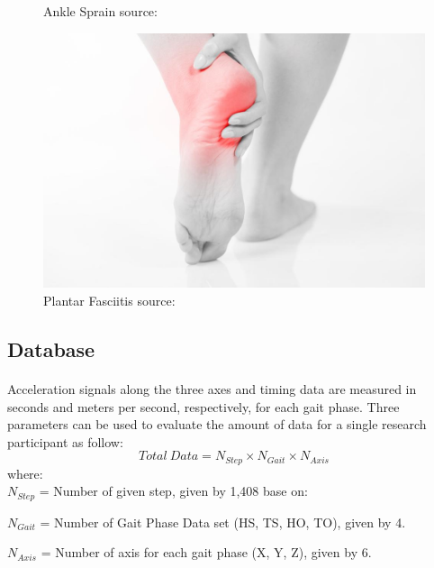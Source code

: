 {\begin{figure}[ht]
\begin{minipage}[b]{0.20\linewidth}
            \caption{Ankle Sprain  source:\cite{AnkleSprain2023}}
            \label{fig:b}
        \end{minipage}
        \hspace{0.5cm}
         \begin{minipage}[b]{0.20\linewidth}
            \centering
            \includegraphics[width=\textwidth]{img/Plantar Fasciitis.jpeg}
            \caption{Plantar Fasciitis  source:\cite{PlantarFasciitis2023}}
            \label{fig:b}
        \end{minipage}
    \end{figure}
}


\subsection{Database}
\STANDARD{\insertsection}
{
\framesubtitle{\insertsubsection}

Acceleration signals along the three axes and timing data are measured in seconds and meters per second, respectively, for each gait phase. Three parameters can be used to evaluate the amount of data for a single research participant as follow:
\begin{equation}
\label{eqn:2.1}
    Total\:Data = N_{Step} \times N_{Gait} \times N_{Axis}
\end{equation}
where: \\

$N_{Step}$ = Number of given step, given by 1,408 base on: \cite{Hoeger2008}\\
\bigskip

$N_{Gait}$ = Number of Gait Phase Data set (HS, TS, HO, TO), given by 4.\\
\bigskip

$N_{Axis}$ = Number of axis for each gait phase (X, Y, Z), given by 6.\\
}

